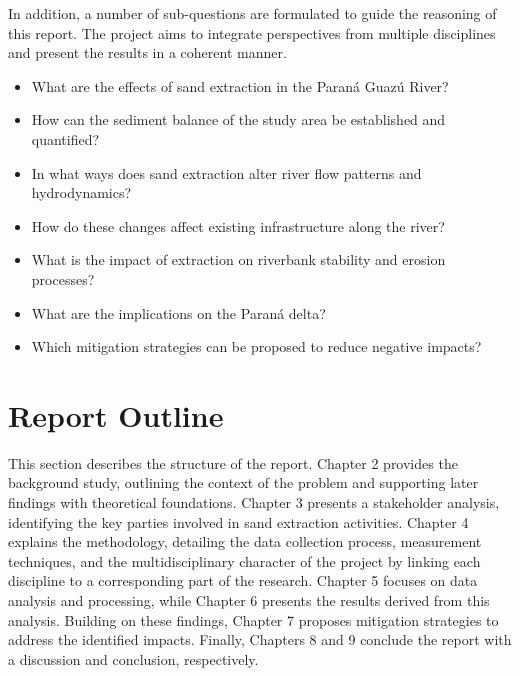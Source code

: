In addition, a number of sub-questions are formulated to guide the reasoning of this report. The project aims to integrate perspectives from multiple disciplines and present the results in a coherent manner.

\begin{itemize} 
    \item What are the effects of sand extraction in the Paraná Guazú River?
    \item How can the sediment balance of the study area be established and quantified?
    \item In what ways does sand extraction alter river flow patterns and hydrodynamics?
    \item How do these changes affect existing infrastructure along the river?
    \item What is the impact of extraction on riverbank stability and erosion processes?
    \item What are the implications on the Paraná delta?
    \item Which mitigation strategies can be proposed to reduce negative impacts?
\end{itemize}


\section{Report Outline}
This section describes the structure of the report. Chapter 2 provides the background study, outlining the context of the problem and supporting later findings with theoretical foundations. Chapter 3 presents a stakeholder analysis, identifying the key parties involved in sand extraction activities. Chapter 4 explains the methodology, detailing the data collection process, measurement techniques, and the multidisciplinary character of the project by linking each discipline to a corresponding part of the research. Chapter 5 focuses on data analysis and processing, while Chapter 6 presents the results derived from this analysis. Building on these findings, Chapter 7 proposes mitigation strategies to address the identified impacts. Finally, Chapters 8 and 9 conclude the report with a discussion and conclusion, respectively.











